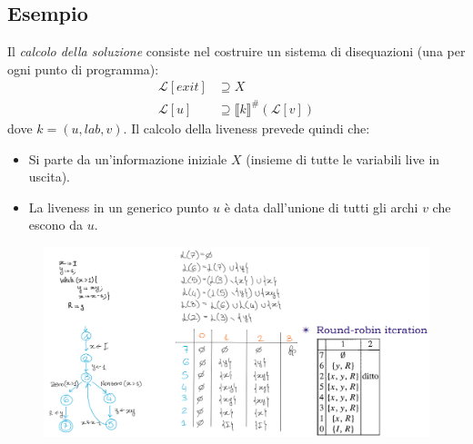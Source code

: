 \documentclass[a4paper,oneside,titlepage]{book}
\begin{document}
\subsection{Esempio}
\label{live5}
Il \textit{calcolo della soluzione} consiste nel costruire un sistema di disequazioni (una per ogni punto di programma):
\begin{align*}
    \mathcal{L}[exit] &\supseteq X \\
    \mathcal{L}[u] &\supseteq \llbracket k \rrbracket^\# (\mathcal{L}[v])
\end{align*}
dove $k=(u,lab,v)$. Il calcolo della liveness prevede quindi che:
\begin{itemize}
    \item Si parte da un'informazione iniziale $X$ (insieme di tutte le variabili live in uscita).
    \item La liveness in un generico punto $u$ è data dall'unione di tutti gli archi $v$ che escono da $u$.
\end{itemize}
\begin{figure}[htp]
	\centering
	\includegraphics[width=\textwidth, height=\textheight, keepaspectratio]{liveness4.png}
\end{figure}
\end{document}
